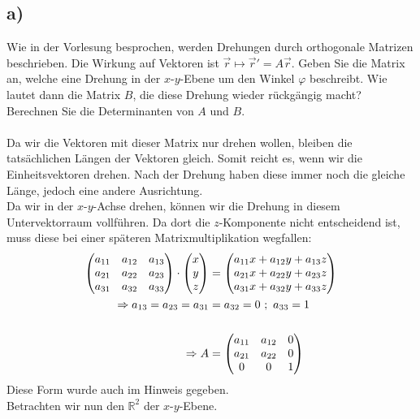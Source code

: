 \documentclass{theozettel}
\begin{document}
\subsection*{a)}Wie in der Vorlesung besprochen, werden Drehungen durch orthogonale Matrizen beschrieben. Die Wirkung auf Vektoren ist $\vec{r}\mapsto\vec{r}'=A\vec{r}$. Geben Sie die Matrix an, welche eine Drehung in der $x$-$y$-Ebene um den Winkel $\varphi$ beschreibt. Wie lautet dann die Matrix $B$, die diese Drehung wieder rückgängig macht? Berechnen Sie die Determinanten von $A$ und $B$.\\\\
Da wir die Vektoren mit dieser Matrix nur drehen wollen, bleiben die tatsächlichen Längen der Vektoren gleich. Somit reicht es, wenn wir die Einheitsvektoren drehen. Nach der Drehung haben diese immer noch die gleiche Länge, jedoch eine andere Ausrichtung.\\
Da wir in der $x$-$y$-Achse drehen, können wir die Drehung in diesem Untervektorraum vollführen. Da dort die $z$-Komponente nicht entscheidend ist, muss diese bei einer späteren Matrixmultiplikation wegfallen:
\begin{align*}
\mqty(a_{11} & a_{12} & a_{13}\\a_{21} &a_{22} & a_{23}\\a_{31} &a_{32} & a_{33})\cdot\mqty(x\\y\\z)&=\mqty(a_{11}x+a_{12}y+a_{13}z\\a_{21}x+a_{22}y+a_{23}z\\a_{31}x+a_{32}y+a_{33}z)\\
\Rightarrow a_{13}=a_{23}=a_{31}&=a_{32}=0\ ; \ a_{33}=1\\\\
\Rightarrow A&=\mqty(a_{11} & a_{12} & 0\\a_{21} &a_{22} & 0\\0 & 0 & 1)
\end{align*}
Diese Form wurde auch im Hinweis gegeben.\\
Betrachten wir nun den $\mathbb{R}^2$ der $x$-$y$-Ebene.
\end{document}
